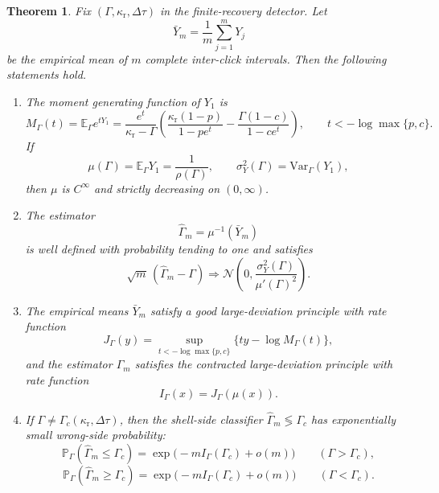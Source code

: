 \documentclass[11pt]{article}
\newtheorem{theorem}{Theorem}[section]
\theoremstyle{definition}
\newcommand{\EE}{\mathbb{E}}
\newcommand{\PP}{\mathbb{P}}
\newcommand{\Var}{\mathrm{Var}}
\begin{document}
\begin{theorem}\label{thm:gap-inference-main}
Fix $(\Gamma,\kappa_{\mathrm r},\Delta\tau)$ in the finite-recovery detector. Let
\[
\bar Y_m=\frac{1}{m}\sum_{j=1}^m Y_j
\]
be the empirical mean of $m$ complete inter-click intervals. Then the following statements hold.
\begin{enumerate}[label=\textup{(\roman*)},leftmargin=2.2em,itemsep=0.25em]
\item The moment generating function of $Y_1$ is
\begin{equation}\label{eq:gap-mgf-main}
M_\Gamma(t)=\EE_\Gamma e^{tY_1}
=
\frac{e^t}{\kappa_{\mathrm r}-\Gamma}
\left(
\frac{\kappa_{\mathrm r}(1-p)}{1-pe^t}
-
\frac{\Gamma(1-c)}{1-ce^t}
\right),
\qquad
t<-\log\max\{p,c\}.
\end{equation}
If
\[
\mu(\Gamma)=\EE_\Gamma Y_1=\frac{1}{\rho(\Gamma)},
\qquad
\sigma_Y^2(\Gamma)=\Var_\Gamma(Y_1),
\]
then $\mu$ is $C^\infty$ and strictly decreasing on $(0,\infty)$.
\item The estimator
\[
\widehat\Gamma_m=\mu^{-1}(\bar Y_m)
\]
is well defined with probability tending to one and satisfies
\begin{equation}\label{eq:gap-clt-main}
\sqrt m\,(\widehat\Gamma_m-\Gamma)
\Longrightarrow
\mathcal N\!\left(0,\frac{\sigma_Y^2(\Gamma)}{\mu'(\Gamma)^2}\right).
\end{equation}
\item The empirical means $\bar Y_m$ satisfy a good large-deviation principle with rate function
\begin{equation}\label{eq:gap-rate-main}
J_\Gamma(y)=\sup_{t<-\log\max\{p,c\}}
\bigl\{ty-\log M_\Gamma(t)\bigr\},
\end{equation}
and the estimator $\widehat\Gamma_m$ satisfies the contracted large-deviation principle with rate function
\begin{equation}\label{eq:gap-rate-gamma-main}
I_\Gamma(x)=J_\Gamma(\mu(x)).
\end{equation}
\item If $\Gamma\neq\Gamma_c(\kappa_{\mathrm r},\Delta\tau)$, then the shell-side classifier $\widehat\Gamma_m\lessgtr\Gamma_c$ has exponentially small wrong-side probability:
\begin{equation}\label{eq:gap-error-main}
\PP_\Gamma(\widehat\Gamma_m\le\Gamma_c)
=
\exp\!\bigl(-mI_\Gamma(\Gamma_c)+o(m)\bigr)
\qquad (\Gamma>\Gamma_c),
\end{equation}
\begin{equation}\label{eq:gap-error-below-main}
\PP_\Gamma(\widehat\Gamma_m\ge\Gamma_c)
=
\exp\!\bigl(-mI_\Gamma(\Gamma_c)+o(m)\bigr)
\qquad (\Gamma<\Gamma_c).
\end{equation}
\end{enumerate}
\end{theorem}
\end{document}
